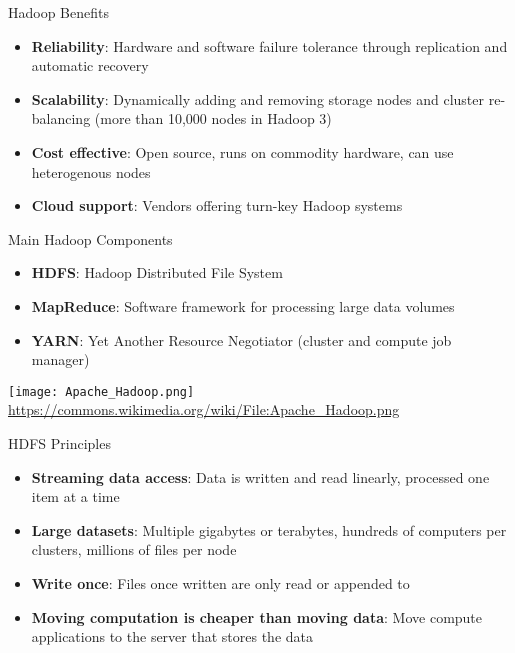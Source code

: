 \documentclass[ignorenonframetext,xcolor=x11names]{beamer}
\begin{document}
\begin{frame}{Hadoop Benefits}
\begin{itemize}
  \item \textbf{Reliability}: Hardware and software failure tolerance through replication and automatic recovery
  \item \textbf{Scalability}: Dynamically adding and removing storage nodes and cluster re-balancing (more than 10,000 nodes in Hadoop 3)
  \item \textbf{Cost effective}: Open source, runs on commodity hardware, can use heterogenous nodes
  \item \textbf{Cloud support}: Vendors offering turn-key Hadoop systems
\end{itemize}
\end{frame}

\begin{frame}{Main Hadoop Components}
\begin{itemize}
    \item \textbf{HDFS}: Hadoop Distributed File System
    \item \textbf{MapReduce}: Software framework for processing large data volumes
    \item \textbf{YARN}: Yet Another Resource Negotiator (cluster and compute job manager)
\end{itemize}

\centering
\vspace{2\baselineskip}
\texttt{[image: Apache\_Hadoop.png]}
\scriptsize \url{https://commons.wikimedia.org/wiki/File:Apache_Hadoop.png}
\end{frame}

\begin{frame}{HDFS Principles}
\begin{itemize}
   \item \textbf{Streaming data access}: Data is written and read linearly, processed one item at a time
   \item \textbf{Large datasets}: Multiple gigabytes or terabytes, hundreds of computers per clusters, millions of files per node
   \item \textbf{Write once}: Files once written are only read or appended to
   \item \textbf{Moving computation is cheaper than moving data}: Move compute applications to the server that stores the data
\end{itemize}
\end{frame}
\end{document}
